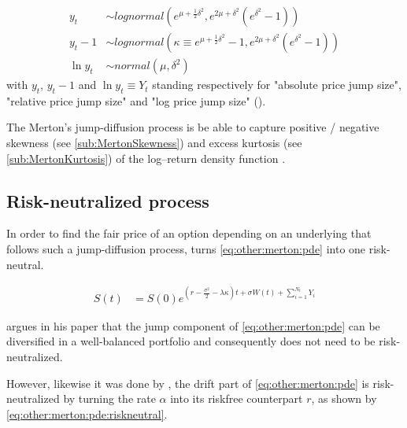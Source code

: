 \documentclass[12pt]{report}
\newcommand{\Bm}{W\left(t\right)}
\newcommand{\St}{S\left(t\right)}
\begin{document}
\begin{align}
  y_t  &\sim lognormal( e^{\mu + \frac{1}{2} \delta^2}, 
                        e^{2 \mu + \delta ^2} (e^{\delta^2} - 1)) 
  \label{eq:yt} \\
  y_t - 1 &\sim lognormal( \kappa \equiv e^{\mu + \frac{1}{2} \delta^2} - 1, 
                        e^{2 \mu + \delta ^2} (e^{\delta^2} - 1)) 
  \label{eq:ytminus1} \\
  \ln{y_t} &\sim normal(\mu, \delta^ 2)
  \label{eq:lny}
\end{align}
with $y_t$, $y_t - 1$ and $\ln{y_t} \equiv Y_t$ standing respectively for "absolute price jump size", "relative price jump size" and "log price jump size" (\citet{matsuda2004}).

 
The Merton's jump-diffusion process is be able to capture positive / negative skewness (see \cref{sub:MertonSkewness}) and excess kurtosis (see \cref{sub:MertonKurtosis}) of the log--return density function \citet{merton76}. 


\subsection{Risk-neutralized process}
\label{sub:other:merton:risk}

In order to find the fair price of an option depending on an underlying that follows such a jump-diffusion process, \citet{merton76} turns \cref{eq:other:merton:pde} into one risk-neutral.

\begin{align}
  \St &= S\left(0\right) e^{\left(r - \frac{\sigma^2}{2} - \lambda \kappa\right) t + \sigma \Bm + \sum_{i=1}^{N_t} Y_i}
  \label{eq:other:merton:pde:riskneutral}
\end{align}

\citet{merton76} argues in his paper that the jump component of \cref{eq:other:merton:pde} can be diversified in a well-balanced portfolio and consequently does not need to be risk-neutralized.

However, likewise it was done by \citet{bs}, the drift part of \cref{eq:other:merton:pde} is risk-neutralized by turning the rate $\alpha$ into its riskfree counterpart $r$, as shown by \cref{eq:other:merton:pde:riskneutral}.



\end{document}
